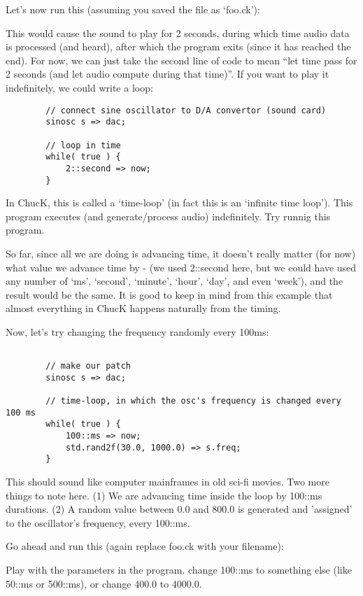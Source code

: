 Let's now run this (assuming you saved the file as `foo.ck'):


This would cause the sound to play for 2 seconds, during which time audio data is processed (and heard), after which the program exits (since it has reached the end). For now, we can just take the second line of code to mean ``let time pass for 2 seconds (and let audio compute during that time)''. If you want to play it indefinitely, we could write a loop:

\begin{verbatim}
        // connect sine oscillator to D/A convertor (sound card)
        sinosc s => dac;

        // loop in time
        while( true ) {
            2::second => now;
        }
\end{verbatim}

In ChucK, this is called a `time-loop' (in fact this is an `infinite time loop'). This program executes (and generate/process audio) indefinitely. Try runnig this program. 

So far, since all we are doing is advancing time, it doesn't really matter (for now) what value we advance time by - (we used 2::second here, but we could have used any number of `ms', `second', `minute', `hour', `day', and even `week'), and the result would be the same. It is good to keep in mind from this example that almost everything in ChucK happens naturally from the timing. 

Now, let's try changing the frequency randomly every 100ms:
\begin{verbatim}

        // make our patch
        sinosc s => dac;

        // time-loop, in which the osc's frequency is changed every 100 ms
        while( true ) {
            100::ms => now;
            std.rand2f(30.0, 1000.0) => s.freq;
        }
\end{verbatim}

This should sound like computer mainframes in old sci-fi movies. Two more things to note here. (1) We are advancing time inside the loop by 100::ms durations. (2) A random value between 0.0 and 800.0 is generated and 'assigned' to the oscillator's frequency, every 100::ms. 

Go ahead and run this (again replace foo.ck with your filename):

Play with the parameters in the program. change 100::ms to something else (like 50::ms or 500::ms), or change 400.0 to 4000.0. 

